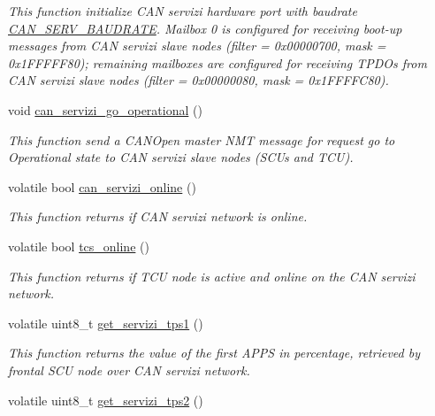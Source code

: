 \begin{DoxyCompactItemize}
\begin{DoxyCompactList}\small\item\em This function initialize C\+AN servizi hardware port with baudrate \mbox{\hyperlink{common_8h_a2a5e84dfc7fa972b75e7ddbc6cc52a45}{C\+A\+N\+\_\+\+S\+E\+R\+V\+\_\+\+B\+A\+U\+D\+R\+A\+TE}}. Mailbox 0 is configured for receiving boot-\/up messages from C\+AN servizi slave nodes (filter = 0x00000700, mask = 0x1\+F\+F\+F\+F\+F80); remaining mailboxes are configured for receiving T\+P\+D\+Os from C\+AN servizi slave nodes (filter = 0x00000080, mask = 0x1\+F\+F\+F\+F\+C80). \end{DoxyCompactList}\item 
void \mbox{\hyperlink{group___c_a_n__servizi__group_gad444fb6be3b439dcfbefff66e85efd94}{can\+\_\+servizi\+\_\+go\+\_\+operational}} ()
\begin{DoxyCompactList}\small\item\em This function send a C\+A\+N\+Open master N\+MT message for request \textquotesingle{}go to Operational\textquotesingle{} state to C\+AN servizi slave nodes (S\+C\+Us and T\+CU). \end{DoxyCompactList}\item 
volatile bool \mbox{\hyperlink{group___c_a_n__servizi__group_ga43e9ef52770f760c5751d83b138c7e6b}{can\+\_\+servizi\+\_\+online}} ()
\begin{DoxyCompactList}\small\item\em This function returns if C\+AN servizi network is online. \end{DoxyCompactList}\item 
volatile bool \mbox{\hyperlink{group___c_a_n__servizi__group_ga0c5f72386ae62e3e0b6908efa2fb2b28}{tcs\+\_\+online}} ()
\begin{DoxyCompactList}\small\item\em This function returns if T\+CU node is active and online on the C\+AN servizi network. \end{DoxyCompactList}\item 
volatile uint8\+\_\+t \mbox{\hyperlink{group___c_a_n__servizi__group_gac899876f81f391e2daafcd8b22d2f32e}{get\+\_\+servizi\+\_\+tps1}} ()
\begin{DoxyCompactList}\small\item\em This function returns the value of the first A\+P\+PS in percentage, retrieved by frontal S\+CU node over C\+AN servizi network. \end{DoxyCompactList}\item 
volatile uint8\+\_\+t \mbox{\hyperlink{group___c_a_n__servizi__group_ga431b31efe978864b1a2db0d57a5b572a}{get\+\_\+servizi\+\_\+tps2}} ()

\end{DoxyCompactItemize}
